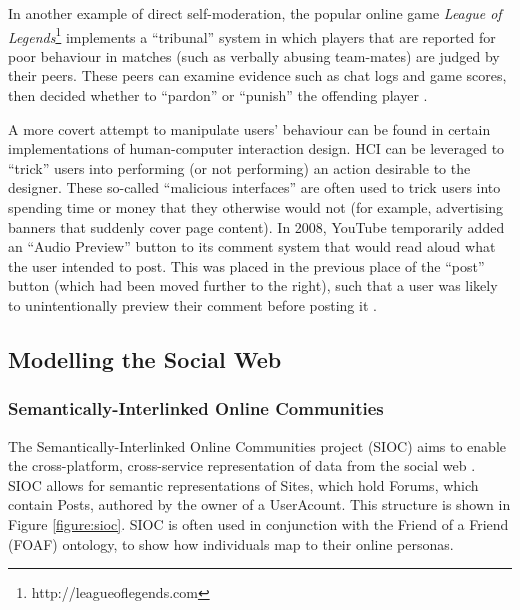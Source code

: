 In another example of direct self-moderation, the popular online game \textit{League of Legends}\footnote{http://leagueoflegends.com} implements a ``tribunal'' system in which players that are reported for poor behaviour in matches (such as verbally abusing team-mates) are judged by their peers. These peers can examine evidence such as chat logs and game scores, then decided whether to ``pardon'' or ``punish'' the offending player \citep{Hodson2013, kou2013regulating}.

A more covert attempt to manipulate users' behaviour can be found in certain implementations of human-computer interaction design. HCI can be leveraged to ``trick'' users into performing (or not performing) an action desirable to the designer. These so-called ``malicious interfaces'' \citep{Conti2010} are often used to trick users into spending time or money that they otherwise would not (for example, advertising banners that suddenly cover page content). In 2008, YouTube temporarily added an ``Audio Preview'' button to its comment system that would read aloud what the user intended to post. This was placed in the previous place of the ``post'' button (which had been moved further to the right), such that a user was likely to unintentionally preview their comment before posting it \citep{Munroe2008}.


\subsection{Modelling the Social Web}



\subsubsection{Semantically-Interlinked Online Communities}
The Semantically-Interlinked Online Communities project (SIOC) aims to enable the cross-platform, cross-service representation of data from the social web \citep{Breslin2006}. SIOC allows for semantic representations of Sites, which hold Forums, which contain Posts, authored by the owner of a UserAcount. This structure is shown in Figure \ref{figure:sioc}. SIOC is often used in conjunction with the Friend of a Friend (FOAF) ontology, to show how individuals map to their online personas.

